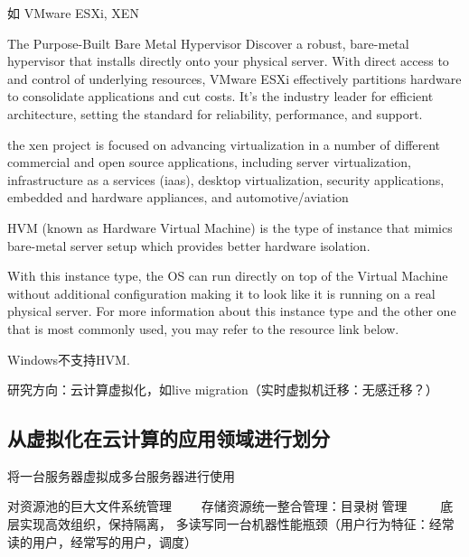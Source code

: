 如 VMware ESXi, XEN

\begin{definition}
    The Purpose-Built Bare Metal Hypervisor
Discover a robust, bare-metal hypervisor that installs directly onto your physical server. With direct access to and control of underlying resources, VMware ESXi effectively partitions hardware to consolidate applications and cut costs. It's the industry leader for efficient architecture, setting the standard for reliability, performance, and support.
\end{definition}

\begin{definition}[Xen]
    the xen project is focused on advancing virtualization in a number of different commercial and open source applications, including server virtualization, infrastructure as a services (iaas), desktop virtualization, security applications, embedded and hardware appliances, and automotive/aviation
\end{definition}

\begin{definition}
    HVM (known as Hardware Virtual Machine) is the type of instance that mimics bare-metal server setup which provides better hardware isolation. 
    
    With this instance type, the OS can run directly on top of the Virtual Machine without additional configuration making it to look like it is running on a real physical server. For more information about this instance type and the other one that is most commonly used, you may refer to the resource link below.
\end{definition}

\begin{remark}
    Windows不支持HVM.
\end{remark}

研究方向：云计算虚拟化，如live migration（实时虚拟机迁移：无感迁移？）


\subsection{从虚拟化在云计算的应用领域进行划分}
\begin{definition}[服务器虚拟化]
    将一台服务器虚拟成多台服务器进行使用

    对资源池的巨大文件系统管理 
　　存储资源统一整合管理：目录树🌲管理
　　🔀底层实现高效组织，保持隔离，
多‍‍‍读写同一台机器性能瓶颈（用户行为特征：经常读的用户，经常写的用户，调度）
\end{definition}


